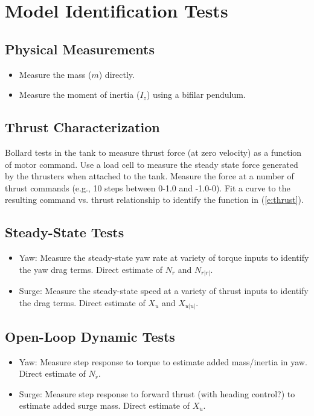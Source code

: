 \documentclass[11pt,draftcls,journal,onecolumn]{IEEEtran}
\begin{document}
\section{Model Identification Tests}
\subsection{Physical Measurements}
\begin{itemize}
\item Measure the mass ($m$) directly.  
\item Measure the moment of inertia ($I_z$) using a bifilar pendulum.
\end{itemize}

\subsection{Thrust Characterization}
Bollard tests in the tank to measure thrust force (at zero velocity) as a function of motor command.  Use a load cell to measure the steady state force generated by the thrusters when attached to the tank.  Measure the force at a number of thrust commands (e.g., 10 steps between 0-1.0 and -1.0-0).  Fit a curve to the resulting command vs. thrust relationship to identify the function in (\ref{e:thrust}).

\subsection{Steady-State Tests}
\begin{itemize}
\item Yaw: Measure the steady-state yaw rate at variety of torque inputs to identify the yaw drag terms. Direct estimate of $N_r$ and $N_{r|r|}$.
\item Surge: Measure the steady-state speed at a variety of thrust inputs to identify the drag terms. Direct estimate of $X_u$ and $X_{u|u|}$.
\end{itemize}


\subsection{Open-Loop Dynamic Tests}
\begin{itemize}
\item Yaw: Measure step response to torque to estimate added mass/inertia in yaw.  Direct estimate of $N_{\dot{r}}$.
\item Surge: Measure step response to forward thrust (with heading control?) to estimate added surge mass. Direct estimate of $X_{\dot{u}}$.
\end{itemize}
\end{document}
